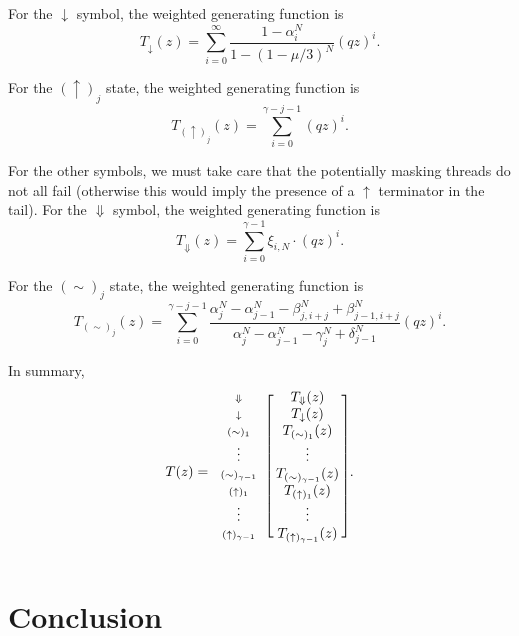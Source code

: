 \documentclass{article}
\newcommand{\DN}{\scriptstyle{\Downarrow}}
\newcommand{\dn}{\scriptstyle{\downarrow}}
\newcommand{\up}[1]{\scriptstyle{(\uparrow)_{#1}}}
\newcommand{\eq}[1]{\scriptstyle{(\sim)_{#1}}}
\begin{document}
For the $\downarrow$ symbol, the weighted generating function is
\begin{equation}
T_{\downarrow}(z) = \sum_{i=0}^\infty
\frac{1-\alpha_i^N}{1-(1-\mu/3)^N} (qz)^i.
\end{equation}

For the $(\uparrow)_j$ state, the weighted generating function is
\begin{equation}
T_{(\uparrow)_j}(z) = \sum_{i=0}^{\gamma-j-1} (qz)^i.
\end{equation}

For the other symbols, we must take care that the potentially masking
threads do not all fail (otherwise this would imply the presence of a
$\uparrow$ terminator in the tail). For the $\Downarrow$ symbol, the
weighted generating function is
\begin{equation}
T_{\Downarrow}(z) = \sum_{i=0}^{\gamma-1} \xi_{i,N} \cdot (qz)^i.
\end{equation}

For the $(\sim)_j$ state, the weighted generating function is
\begin{equation}
T_{(\sim)_j}(z) = \sum_{i=0}^{\gamma-j-1}
\frac{ \alpha_j^N-\alpha_{j-1}^N-\beta_{j,i+j}^N +\beta_{j-1,i+j}^N }
{\alpha_j^N-\alpha_{j-1}^N-\gamma_j^N+\delta_{j-1}^N} (qz)^i.
\end{equation}

In summary,
\begin{equation*}
T(z) = 
\begin{blockarray}{cc}
\begin{block}{c[c]}
\DN & T_\Downarrow(z) \\
\dn & T_\downarrow(z) \\
\eq{1} & T_{(\sim)_1}(z) \\
\vdots & \vdots \\
\eq{\gamma-1} & T_{(\sim)_{\gamma-1}}(z) \\
\up{1} & T_{(\uparrow)_1}(z) \\
\vdots & \vdots \\
\up{\gamma-1} & \; T_{(\uparrow)_{\gamma-1}}(z) \; \\
\end{block}
\end{blockarray}.
\end{equation*}


\section{Conclusion}
\end{document}
